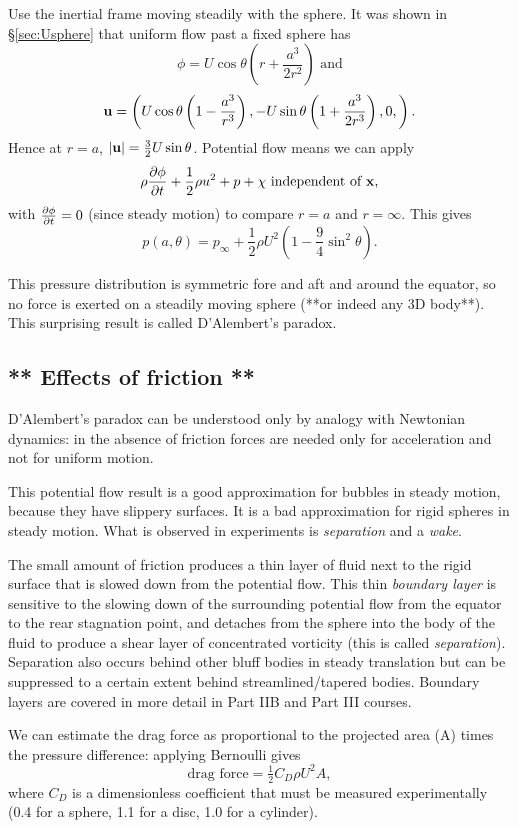 \documentclass{notes}
\begin{document}
Use the inertial frame moving steadily with the sphere.  It was shown
in \S\ref{sec:Usphere} that uniform flow past a fixed sphere has
\[
\phi = U \cos \theta \left( r +\frac{a^3}{2r^2} \right) \text{ and}
\]
\[
\mathbf{u} = \left( U \cos \theta \left(1 - \frac{a^3}{r^3} \right),-U \sin
  \theta \left( 1+ \frac{a^3}{2r^3}\right),0,\right).
\]
Hence at $r=a$, $\left|\mathbf{u}\right|=\frac{3}{2}U \sin \theta$.  Potential flow
means we can apply
\[
\rho \frac{\partial \phi}{\partial t} + \frac{1}{2}\rho u^2 + p +\chi \text{ independent
  of $\mathbf{x}$,}
\] with $\frac{\partial \phi}{\partial t}=0$ (since steady motion) to compare $r=a$ and $r=\infty$.
This gives
\[
p(a,\theta)=p_\infty+\frac{1}{2}\rho U^2 \left( 1-\frac{9}{4} \sin^2
  \theta \right).
\]

This pressure distribution is symmetric fore and aft and around the
equator, so no force is exerted on a steadily moving sphere (**or
indeed any 3D body**).  This surprising result is called D'Alembert's
paradox.

\subsection[Effects of friction]{** Effects of friction **}

D'Alembert's paradox can be understood only by analogy with Newtonian
dynamics: in the absence of friction forces are needed only for
acceleration and not for uniform motion.

This potential flow result is a good approximation for bubbles
in steady motion, because they have slippery surfaces.  It is a bad
approximation for rigid spheres in steady motion.  What is observed in
experiments is \emph{separation} and a \emph{wake}.

\vspace{1.5in}

The small amount of friction produces a thin layer of fluid next to
the rigid surface that is slowed down from the potential flow.  This
thin \emph{boundary layer} is sensitive to the slowing down of the
surrounding potential flow from the equator to the rear stagnation
point, and detaches from the sphere into the body of the fluid to
produce a shear layer of concentrated vorticity (this is called
\emph{separation}).  Separation also occurs behind other bluff bodies
in steady translation but can be suppressed to a certain extent behind
streamlined/tapered bodies.  Boundary layers are covered in more
detail in Part IIB and Part III courses.

We can estimate the drag force as proportional to the projected area (A)
times the pressure difference: applying Bernoulli gives
\[
\text{drag force} = \tfrac{1}{2} C_D \rho U^2 A,
\]
where $C_D$ is a dimensionless coefficient that must be measured
experimentally (0.4 for a sphere, 1.1 for a disc, 1.0 for a cylinder).
\end{document}
